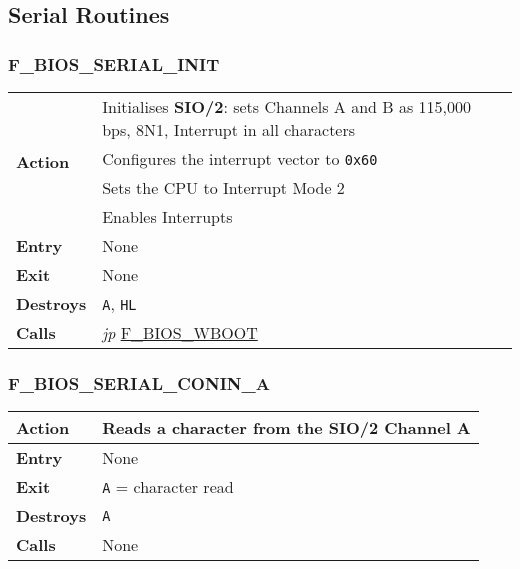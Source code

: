     \subsection{Serial Routines}

        \subsubsection{F\_BIOS\_SERIAL\_INIT}
        \label{func:fbiosserialinit}
        \begin{tabular}{l p{15cm}}
            \hline\multirow[t]{4}{4em}{\textbf{Action}}
            & Initialises \textbf{SIO/2}: sets Channels A and B as 115,000 bps, 
            8N1, Interrupt in all characters \\
            & Configures the interrupt vector to \texttt{0x60} \\
            & Sets the CPU to Interrupt Mode 2 \\
            & Enables Interrupts \\
            \hline\textbf{Entry} & None \\
            \hline\textbf{Exit} & None \\
            \hline\textbf{Destroys} & \texttt{A}, \texttt{HL} \\
            \hline\textbf{Calls} 
            & \textit{jp} \hyperref[func:fbioswboot]{F\_BIOS\_WBOOT} \\
            \hline
        \end{tabular}
        
        \subsubsection{F\_BIOS\_SERIAL\_CONIN\_A}
        \label{func:fbiosserialconina}
        \begin{tabular}{l p{15cm}}
            \hline\textbf{Action}
            & Reads a character from the \textbf{SIO/2} Channel A \\
            \hline\textbf{Entry} & None \\
            \hline\textbf{Exit} & \texttt{A} = character read \\
            \hline\textbf{Destroys} & \texttt{A} \\
            \hline\textbf{Calls} & None \\
            \hline
        \end{tabular}

